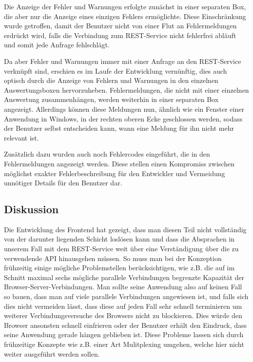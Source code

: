 Die Anzeige der Fehler und Warnungen erfolgte zunächst in einer separaten Box, die aber nur die Anzeige eines einzigen Fehlers ermöglichte. Diese Einschränkung wurde getroffen, damit der Benutzer nicht von einer Flut an Fehlermeldungen erdrückt wird, falls die Verbindung zum REST-Service nicht fehlerfrei abläuft und somit jede Anfrage fehlschlägt.

Da aber Fehler und Warnungen immer mit einer Anfrage an den REST-Service verknüpft sind, erschien es im Laufe der Entwicklung vernünftig, dies auch optisch durch die Anzeige von Fehlern und Warnungen in den einzelnen Auswertungsboxen hervorzuheben. Fehlermeldungen, die nicht mit einer einzelnen Auswertung zusammenhängen, werden weiterhin in einer separaten Box angezeigt. Allerdings können diese Meldungen nun, ähnlich wie ein Fenster einer Anwendung in Windows, in der rechten oberen Ecke geschlossen werden, sodass der Benutzer selbst entscheiden kann, wann eine Meldung für ihn nicht mehr relevant ist.

Zusätzlich dazu wurden auch noch Fehlercodes eingeführt, die in den Fehlermeldungen angezeigt werden. Diese stellen einen Kompromiss zwischen möglichst exakter Fehlerbeschreibung für den Entwickler und Vermeidung unnötiger Details für den Benutzer dar.

\subsection{Diskussion}
Die Entwicklung des Frontend hat gezeigt, dass man diesen Teil nicht vollständig von der darunter liegenden Schicht loslösen kann und dass die Absprachen in unserem Fall mit dem REST-Service weit über eine Verständigung über die zu verwendende API hinausgehen müssen.
So muss man bei der Konzeption frühzeitig einige mögliche Problemstellen berücksichtigen, wie z.B. die auf im Schnitt maximal sechs mögliche parallele Verbindungen begrenzte Kapazität der Browser-Server-Verbindungen. Man sollte seine Anwendung also auf keinen Fall so bauen, dass man auf viele parallele Verbindungen angewiesen ist, und falls sich dies nicht vermeiden lässt, dass diese auf jeden Fall sehr schnell terminieren um weiterer Verbindungsversuche des Browsers nicht zu blockieren. Dies würde den Browser ansonsten schnell einfrieren oder der Benutzer erhält den Eindruck, dass seine Anwendung gerade hängen geblieben ist.
Diese Probleme lassen sich durch frühzeitige Konzepte wie z.B. einer Art Mulitplexing umgehen, welche hier nicht weiter ausgeführt werden sollen.

